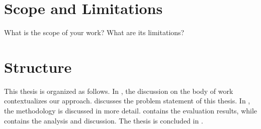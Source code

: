 \section{Scope and Limitations}

What is the scope of your work? What are its limitations?

\section{Structure}

This thesis is organized as follows. In , the discussion on the body of work contextualizes our approach.  discusses the problem statement of this thesis. In , the methodology is discussed in more detail.  contains the evaluation results, while  contains the analysis and discussion. The thesis is concluded in .
